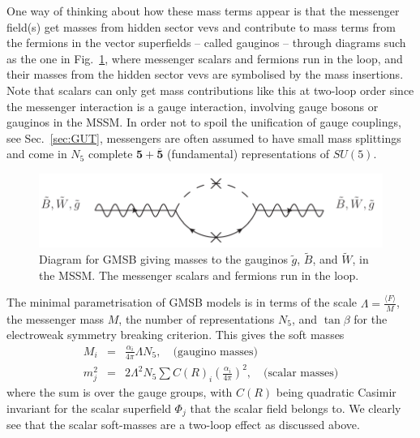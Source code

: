 \documentclass[notes.tex]{subfiles}
\begin{document}
One way of thinking about how these mass terms appear is that the messenger field(s) get masses from hidden sector vevs and contribute to mass terms from the fermions in the vector superfields -- called gauginos --  through diagrams such as the one in Fig.~\ref{fig:GMSB}, where messenger scalars and fermions run in the loop, and their masses from the hidden sector vevs are symbolised by the mass insertions. Note that scalars can only get mass contributions like this at two-loop order since the messenger interaction is a gauge interaction, involving gauge bosons or gauginos in the MSSM. In order not to spoil the unification of gauge couplings, see Sec.~\ref{sec:GUT}, messengers are often assumed to have small mass splittings and come in $N_5$ complete $\mathbf{5} + \overline{\mathbf{5}}$ (fundamental) representations of $SU(5)$.

\begin{figure}[h!]
\begin{center}
\includegraphics[scale=0.8]{figures/GMSB} 
\caption{Diagram for GMSB giving masses to the gauginos $\tilde g$, $\tilde B$, and $\tilde W$, in the MSSM. The messenger scalars and fermions run in the loop.}
\label{fig:GMSB}
\end{center}
\end{figure}

The minimal parametrisation of GMSB models is in terms of the scale $\Lambda = \frac{\langle F\rangle}{M}$, the messenger mass $M$, the number of representations $N_5$, and $\tan\beta$ for the electroweak symmetry breaking criterion. This gives the soft masses
\begin{eqnarray}
M_i &=& \frac{\alpha_i}{4\pi}\Lambda N_5,\quad\text{(gaugino masses)}\label{eq:GMSBgauginomass}\\
m_j^2 &=& 2\Lambda^2 N_5 \sum C(R)_i\left(\frac{\alpha_i}{4\pi}\right)^2,\quad\text{(scalar masses)}
\end{eqnarray}
where the sum is over the gauge groups, with $C(R)$ being quadratic Casimir invariant for the scalar superfield $\Phi_j$ that the scalar field belongs to. We clearly see that the scalar soft-masses are a two-loop effect as discussed above. 
\end{document}
